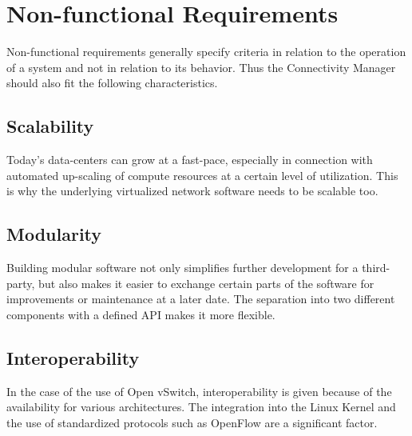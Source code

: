 \section{Non-functional Requirements}

Non-functional requirements generally specify criteria in relation to the operation of a system and not in relation to its behavior. Thus the Connectivity Manager should also fit the following characteristics.

\subsection{Scalability}

Today's data-centers can grow at a fast-pace, especially in connection with automated up-scaling of compute resources at a certain level of utilization. This is why the underlying virtualized network software needs to be scalable too.

\subsection{Modularity}

Building modular software not only simplifies further development for a third-party, but also makes it easier to exchange certain parts of the software for improvements or maintenance at a later date. The separation into two different components with a defined API makes it more flexible.

\subsection{Interoperability}

In the case of the use of Open vSwitch, interoperability is given because of the availability for various architectures. The integration into the Linux Kernel and the use of standardized protocols such as OpenFlow are a significant factor.